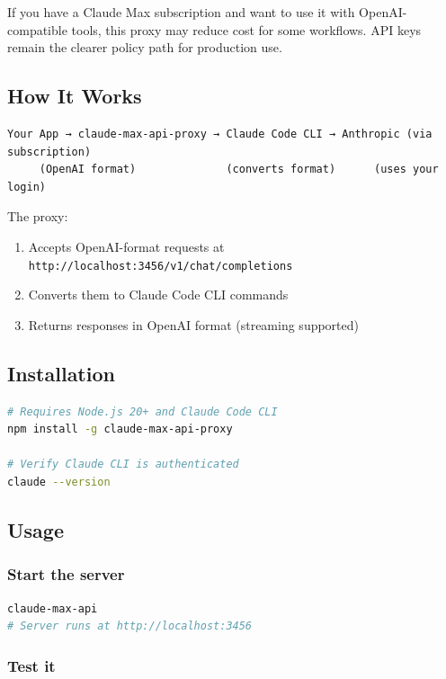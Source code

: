 If you have a Claude Max subscription and want to use it with OpenAI-compatible tools, this proxy may reduce cost for some workflows. API keys remain the clearer policy path for production use.

\subsection{How It Works}


\begin{lstlisting}
Your App → claude-max-api-proxy → Claude Code CLI → Anthropic (via subscription)
     (OpenAI format)              (converts format)      (uses your login)
\end{lstlisting}


The proxy:

\begin{enumerate}
  \item Accepts OpenAI-format requests at \texttt{http://localhost:3456/v1/chat/completions}
  \item Converts them to Claude Code CLI commands
  \item Returns responses in OpenAI format (streaming supported)
\end{enumerate}


\subsection{Installation}


\begin{lstlisting}[language=bash]
# Requires Node.js 20+ and Claude Code CLI
npm install -g claude-max-api-proxy

# Verify Claude CLI is authenticated
claude --version
\end{lstlisting}


\subsection{Usage}


\subsubsection{Start the server}


\begin{lstlisting}[language=bash]
claude-max-api
# Server runs at http://localhost:3456
\end{lstlisting}


\subsubsection{Test it}


